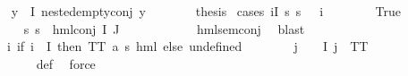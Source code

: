 \begin{isabellebody}
\isanewline
{}\isamarkupfalse%
\isanewline
\ \ \ \ \isamarkupfalse%
\ {\isachardoublequoteopen}{\isasymforall}y{\isasymin}{\isasymPhi}\ {\isacharbackquote}{\kern0pt}\ I{\isachardot}{\kern0pt}\ nested{\isacharunderscore}{\kern0pt}empty{\isacharunderscore}{\kern0pt}conj\ y{\isachardoublequoteclose}\isanewline
\ \ \ \ \isamarkupfalse%
\ \isamarkupfalse%
\ {\isacharquery}{\kern0pt}thesis\ \isamarkupfalse%
{\isacharparenleft}{\kern0pt}cases\ {\isachardoublequoteopen}{\isasymexists}i{\isasymin}I{\isachardot}{\kern0pt}\ {\isacharparenleft}{\kern0pt}{\isasymforall}s{\isachardot}{\kern0pt}\ {\isacharparenleft}{\kern0pt}{\isasymnot}{\isacharparenleft}{\kern0pt}s\ {\isasymTurnstile}\ {\isacharparenleft}{\kern0pt}{\isasymPhi}\ i{\isacharparenright}{\kern0pt}{\isacharparenright}{\kern0pt}{\isacharparenright}{\kern0pt}{\isacharparenright}{\kern0pt}{\isachardoublequoteclose}{\isacharparenright}{\kern0pt}\isanewline
\ \ \ \ \ \ \isamarkupfalse%
\ True\isanewline
\ \ \ \ \ \ \isamarkupfalse%
\ {\isachardoublequoteopen}{\isasymforall}s{\isachardot}{\kern0pt}\ {\isacharparenleft}{\kern0pt}{\isasymnot}{\isacharparenleft}{\kern0pt}s\ {\isasymTurnstile}\ hml{\isacharunderscore}{\kern0pt}conj\ I\ J\ {\isasymPhi}{\isacharparenright}{\kern0pt}{\isacharparenright}{\kern0pt}{\isachardoublequoteclose}\ \isanewline
\ \ \ \ \ \ \ \ \isamarkupfalse%
\ hml{\isacharunderscore}{\kern0pt}sem{\isacharunderscore}{\kern0pt}conj\ \isamarkupfalse%
\ blast\isanewline
\ \ \ \ \ \ \isamarkupfalse%
\ {\isasymPsi}\ \ {\isachardoublequoteopen}{\isasymPsi}\ {\isasymequiv}\ {\isacharparenleft}{\kern0pt}{\isasymlambda}i{\isachardot}{\kern0pt}\ {\isacharparenleft}{\kern0pt}if\ i\ {\isasymin}\ I\ then\ TT{\isacharcolon}{\kern0pt}{\isacharcolon}{\kern0pt}\ {\isacharparenleft}{\kern0pt}{\isacharprime}{\kern0pt}a{\isacharcomma}{\kern0pt}\ {\isacharprime}{\kern0pt}s{\isacharparenright}{\kern0pt}\ hml\ else\ undefined{\isacharparenright}{\kern0pt}{\isacharparenright}{\kern0pt}{\isachardoublequoteclose}\isanewline
\ \ \ \ \ \ \isamarkupfalse%
\ {\isachardoublequoteopen}{\isasymforall}j\ {\isasymin}\ {\isasymPsi}\ {\isacharbackquote}{\kern0pt}\ I{\isachardot}{\kern0pt}\ j\ {\isacharequal}{\kern0pt}\ TT{\isachardoublequoteclose}\ \isanewline
\ \ \ \ \ \ \ \ \isamarkupfalse%
\ {\isasymPsi}{\isacharunderscore}{\kern0pt}def\ \isamarkupfalse%
\ force\isanewline
\ \ \ \ \ \ \isamarkupfalse%

\end{isabellebody}
